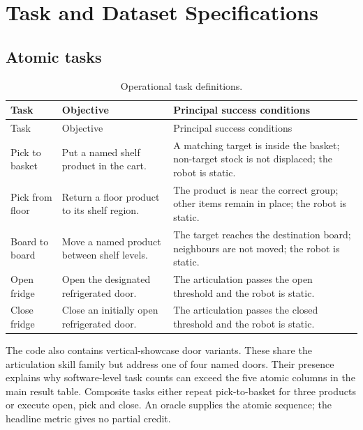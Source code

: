 \chapter{Task and Dataset Specifications}
\label{app:tasks}
\begingroup\justifying
\setlength{\parindent}{2em}\setlength{\parskip}{0.5\baselineskip}

\section{Atomic tasks}
\begin{longtable}{p{}p{}p{}}
\caption{Operational task definitions.}\label{tab:task-definitions}\\
\toprule Task & Objective & Principal success conditions\\\midrule\endfirsthead
\toprule Task & Objective & Principal success conditions\\\midrule\endhead
Pick to basket & Put a named shelf product in the cart. & A matching target is inside the basket; non-target stock is not displaced; the robot is static.\\
Pick from floor & Return a floor product to its shelf region. & The product is near the correct group; other items remain in place; the robot is static.\\
Board to board & Move a named product between shelf levels. & The target reaches the destination board; neighbours are not moved; the robot is static.\\
Open fridge & Open the designated refrigerated door. & The articulation passes the open threshold and the robot is static.\\
Close fridge & Close an initially open refrigerated door. & The articulation passes the closed threshold and the robot is static.\\
\bottomrule\end{longtable}

The code also contains vertical-showcase door variants. These share the articulation skill family but address one of four named doors. Their presence explains why software-level task counts can exceed the five atomic columns in the main result table. Composite tasks either repeat pick-to-basket for three products or execute open, pick and close. An oracle supplies the atomic sequence; the headline metric gives no partial credit.

